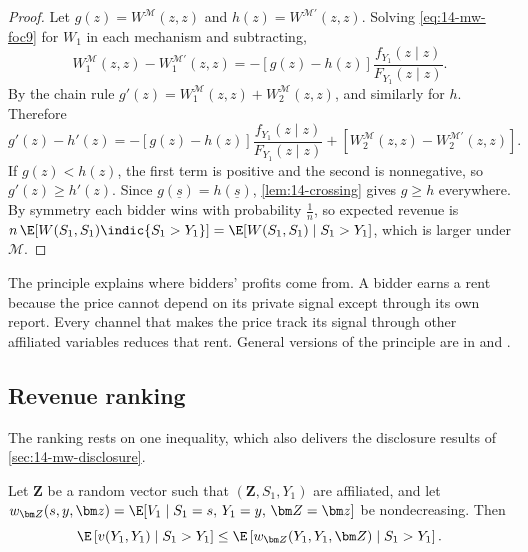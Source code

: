 \begin{proof}
Let $g(z)=W^{\mathcal M}(z,z)$ and $h(z)=W^{\mathcal M'}(z,z)$. Solving \eqref{eq:14-mw-foc9} for $W_1$ in
each mechanism and subtracting,
\begin{equation*}
  W^{\mathcal M}_1(z,z)-W^{\mathcal M'}_1(z,z)=-\left[g(z)-h(z)\right]\frac{f_{Y_1}(z\mid z)}{F_{Y_1}(z\mid z)}.
\end{equation*}
By the chain rule $g'(z)=W^{\mathcal M}_1(z,z)+W^{\mathcal M}_2(z,z)$, and similarly for $h$. Therefore
\begin{equation*}
  g'(z)-h'(z)=-\left[g(z)-h(z)\right]\frac{f_{Y_1}(z\mid z)}{F_{Y_1}(z\mid z)}
  +\left[W^{\mathcal M}_2(z,z)-W^{\mathcal M'}_2(z,z)\right].
\end{equation*}
If $g(z)<h(z)$, the first term is positive and the second is nonnegative, so $g'(z)\ge h'(z)$. Since
$g(\underline s)=h(\underline s)$, \cref{lem:14-crossing} gives $g\ge h$ everywhere. By symmetry each bidder
wins with probability $\frac{1}{n}$, so expected revenue is
$n\,\E[W(S_1,S_1)\indic\{S_1>Y_1\}]=\E[W(S_1,S_1)\mid S_1>Y_1]$, which is larger under $\mathcal M$.
\end{proof}

The principle explains where bidders' profits come from. A bidder earns a rent because the price cannot
depend on its private signal except through its own report. Every channel that makes the price track its
signal through other affiliated variables reduces that rent. General versions of the principle are in
\citet{Milgrom2004} and \citet[Chapter~7]{Krishna2010}.

\subsection{Revenue ranking}\label{sec:14-mw-ranking}

The ranking rests on one inequality, which also delivers the disclosure results of
\cref{sec:14-mw-disclosure}.

\begin{lemma}\label{lem:14-mw-info}
Let $\bm Z$ be a random vector such that $(\bm Z,S_1,Y_1)$ are affiliated, and let
$w_{\bm Z}(s,y,\bm z)=\E[V_1\mid S_1=s,\,Y_1=y,\,\bm Z=\bm z]$ be nondecreasing. Then
\begin{equation*}
  \E\left[v(Y_1,Y_1)\mid S_1>Y_1\right]\le\E\left[w_{\bm Z}(Y_1,Y_1,\bm Z)\mid S_1>Y_1\right].
\end{equation*}
\end{lemma}

